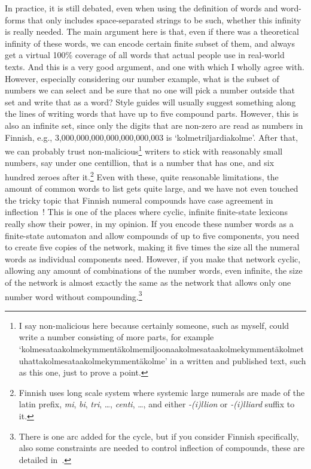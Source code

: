 \documentclass[officiallayout]{unihelcompling}
\begin{document}
In practice, it is still debated, even when using the definition of words and
word-forms that only includes space-separated strings to be such, whether this
infinity is really needed. The main argument here is that, even if there was a
theoretical infinity of these words, we can encode certain finite subset of
them, and always get a virtual 100\% coverage of all words that actual people
use in real-world texts. And this is a very good argument, and one with which I
wholly agree with. However, especially considering our number example, what is
the subset of numbers we can select and be sure that no one will pick a number
outside that set and write that as a word? Style guides will usually suggest
something along the lines of writing words that have up to five compound parts.
However, this is also an infinite set, since only the digits that are non-zero
are read as numbers in Finnish, e.g., 3,000,000,000,000,000,000,003 is
`kolmetriljardiakolme'. After that, we can probably trust
non-malicious\footnote{I say non-malicious here because certainly someone, such
    as myself, could write a number consisting of more parts, for example
    `kolmesataakolmekymmentäkolmemiljoonaakolmesataakolmekymmentäkolmetuhattakolmesataakolmekymmentäkolme'
    in a written and published text, such as this one, just to prove a point.}
    writers to stick with reasonably small numbers, say under one centillion,
    that is a number that has one, and six hundred zeroes after
    it.\footnote{Finnish uses long scale system where systemic large numerals
    are made of the latin prefix, \emph{mi}, \emph{bi}, \emph{tri}, \ldots,
\emph{centi}, \ldots, and either \emph{-(i)llion} or \emph{-(i)lliard} suffix
to it.} Even with these, quite reasonable limitations, the amount of common
words to list gets quite large, and we have not even touched the tricky topic
that Finnish numeral compounds have case agreement in
inflection~\citep{karttunen2006numbers}! This is one of the places where
cyclic, infinite finite-state lexicons really show their power, in my opinion.
If you encode these number words as a \gls{finite-state automaton} and allow
compounds of up to five components, you need to create five copies of the
network, making it five times the size all the numeral words as individual
components need.  However, if you make that network cyclic, allowing any amount
of combinations of the number words, even infinite, the size of the network is
almost exactly the same as the network that allows only one number word without
compounding.\footnote{There is one arc added for the cycle, but if you consider
Finnish specifically, also some constraints are needed to control inflection of
compounds, these are detailed in~\citet{karttunen2006numbers}.}
\end{document}
